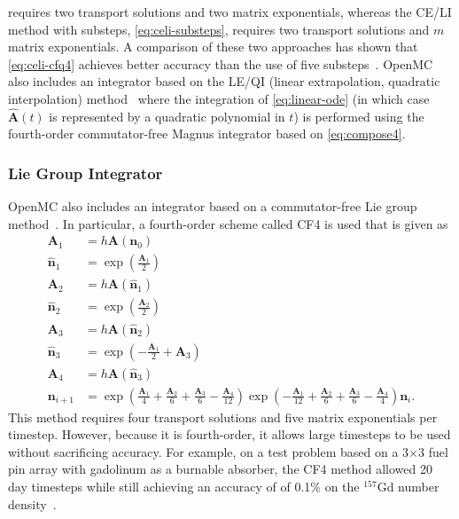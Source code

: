\documentclass[3p,authoryear]{elsarticle}
\newcommand{\vect}[1]{\mathbf{#1}} %
\begin{document}
 requires two transport solutions and two matrix
exponentials, whereas the CE/LI method with substeps, \cref{eq:celi-substeps},
requires two transport solutions and $m$ matrix exponentials. A comparison of
these two approaches has shown that \cref{eq:celi-cfq4} achieves better accuracy
than the use of five substeps~\citep{josey2017phd}. OpenMC also includes an
integrator based on the LE/QI (linear extrapolation, quadratic interpolation)
method~\citep{isotalo2011ane2} where the integration of \cref{eq:linear-ode} (in
which case $\hat{\vect{A}}(t)$ is represented by a quadratic polynomial in $t$)
is performed using the fourth-order commutator-free Magnus integrator based on
\cref{eq:compose4}.

\subsubsection{Lie Group Integrator}

OpenMC also includes an integrator based on a commutator-free Lie group
method~\citep{celledoni2004fgcs}. In particular, a fourth-order scheme called
CF4 is used that is given as
\begin{equation}
  \begin{split}
    \vect{A}_1 &= h\vect{A}(\vect{n}_0) \\
    \hat{\vect{n}}_1 &= \exp \left ( \frac{\vect{A}_1}{2} \right ) \\
    \vect{A}_2 &= h\vect{A}(\hat{\vect{n}}_1) \\
    \hat{\vect{n}}_2 &= \exp \left ( \frac{\vect{A}_2}{2} \right ) \\
    \vect{A}_3 &= h \vect{A}(\hat{\vect{n}}_2) \\
    \hat{\vect{n}}_3 &= \exp \left ( -\frac{\vect{A}_1}{2}  + \vect{A}_3 \right ) \\
    \vect{A}_4 &= h\vect{A}(\hat{\vect{n}}_3) \\
    \vect{n}_{i+1} &= \exp \left ( \frac{\vect{A}_1}{4} + \frac{\vect{A}_2}{6} + \frac{\vect{A}_3}{6} - \frac{\vect{A}_4}{12} \right )
    \exp \left ( -\frac{\vect{A}_1}{12} + \frac{\vect{A}_2}{6} + \frac{\vect{A}_3}{6} - \frac{\vect{A}_4}{4} \right ) \vect{n}_i.
  \end{split}
\end{equation}
This method requires four transport solutions and five matrix exponentials per
timestep. However, because it is fourth-order, it allows large timesteps to be
used without sacrificing accuracy. For example, on a test problem based on a
3$\times$3 fuel pin array with gadolinum as a burnable absorber, the CF4 method
allowed 20 day timesteps while still achieving an accuracy of of 0.1\% on the
$^{157}$Gd number density~\citep{josey2017phd}.
\end{document}
